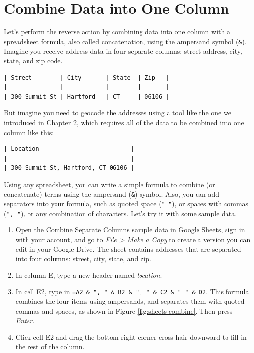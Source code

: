 \documentclass[
  english,
]{book}
\begin{document}
\hypertarget{combine-data}{%
\section*{Combine Data into One Column}\label{combine-data}}

Let's perform the reverse action by combining data into one column with a spreadsheet formula, also called concatenation, using the ampersand symbol (\texttt{\&}). Imagine you receive address data in four separate columns: street address, city, state, and zip code.

\begin{verbatim}
| Street        | City       | State  | Zip   |
| ------------- | ---------- | ------ | ----- |
| 300 Summit St | Hartford   | CT     | 06106 |
\end{verbatim}

But imagine you need to \href{geocode.html}{geocode the addresses using a tool like the one we introduced in Chapter 2}, which requires all of the data to be combined into one column like this:

\begin{verbatim}
| Location                          |
| --------------------------------- |
| 300 Summit St, Hartford, CT 06106 |
\end{verbatim}

Using any spreadsheet, you can write a simple formula to combine (or concatenate) terms
using the ampersand (\texttt{\&}) symbol. Also, you can add separators into your formula, such as quoted space (\texttt{"\ "}), or spaces with commas (\texttt{",\ "}), or any combination of characters. Let's try it with some sample data.

\begin{enumerate}
\def\labelenumi{\arabic{enumi}.}
\item
  Open the \href{https://docs.google.com/spreadsheets/d/1DGKYquQ0nKiBCE_KbQk24Zvjrxb0zKk8gC-FpObY7LM/edit\#gid=0}{Combine Separate Columns sample data in Google Sheets}, sign in with your account, and go to \emph{File \textgreater{} Make a Copy} to create a version you can edit in your Google Drive. The sheet contains addresses that are separated into four columns: street, city, state, and zip.
\item
  In column E, type a new header named \emph{location}.
\item
  In cell E2, type in \texttt{=A2\ \&\ ",\ "\ \&\ B2\ \&\ ",\ "\ \&\ C2\ \&\ "\ "\ \&\ D2}. This formula combines the four items using ampersands, and separates them with quoted commas and spaces, as shown in Figure \ref{fig:sheets-combine}. Then press \emph{Enter}.
\item
  Click cell E2 and drag the bottom-right corner cross-hair downward to fill in the rest of the column.
\end{enumerate}
\end{document}
